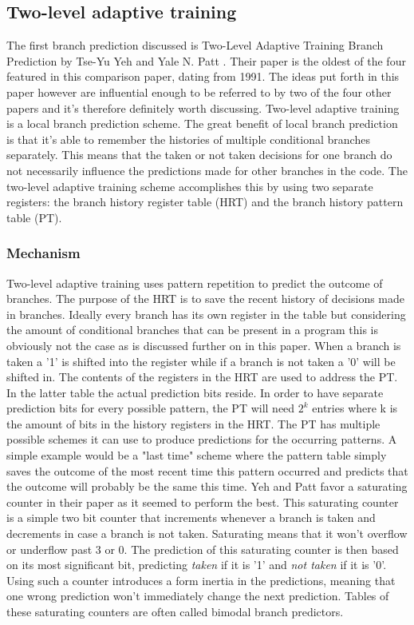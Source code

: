 \subsection{Two-level adaptive training}
\label{two-level}
The first branch prediction discussed is Two-Level Adaptive Training Branch Prediction by Tse-Yu Yeh and Yale N.
Patt \cite{twolevel}.
Their paper is the oldest of the four featured in this comparison paper, dating from 1991. The ideas put forth in this paper however are influential enough to be referred to by two of the four other papers and it's therefore definitely worth discussing.
Two-level adaptive training is a local branch prediction scheme.
The great benefit of local branch prediction is that it's able to remember the histories of multiple conditional branches separately.
This means that the taken or not taken decisions for one branch do not necessarily influence the predictions made for other branches in the code.
The two-level adaptive training scheme accomplishes this by using two separate registers: the branch history register table (HRT) and the branch history pattern table (PT).
\subsubsection{Mechanism}
Two-level adaptive training uses pattern repetition to predict the outcome of branches.
The purpose of the HRT is to save the recent history of decisions made in branches.
Ideally every branch has its own register in the table but considering the amount of conditional branches that can be present in a program this is obviously not the case as is discussed further on in this paper. 
When a branch is taken a '1' is shifted into the register while if a branch is not taken a '0' will be shifted in.
The contents of the registers in the HRT are used to address the PT.
In the latter table the actual prediction bits reside.
In order to have separate prediction bits for every possible pattern, the PT will need $2^k$ entries where k is the amount of bits in the history registers in the HRT.
The PT has multiple possible schemes it can use to produce predictions for the occurring patterns.
A simple example would be a "last time" scheme where the pattern table simply saves the outcome of the most recent time this pattern occurred and predicts that the outcome will probably be the same this time.
Yeh and Patt favor a saturating counter in their paper as it seemed to perform the best.
This saturating counter is a simple two bit counter that increments whenever a branch is taken and decrements in case a branch is not taken.
Saturating means that it won't overflow or underflow past 3 or 0.
The prediction of this saturating counter is then based on its most significant bit, predicting \textit{taken} if it is '1' and \textit{not taken} if it is '0'.
Using such a counter introduces a form inertia in the predictions, meaning that one wrong prediction won't immediately change the next prediction.
Tables of these saturating counters are often called bimodal branch predictors.
